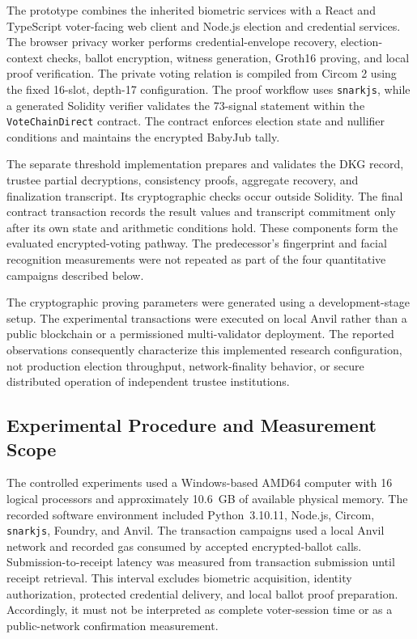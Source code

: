 The prototype combines the inherited biometric services with a
React and TypeScript voter-facing web client and Node.js election
and credential services. The browser privacy worker performs
credential-envelope recovery, election-context checks, ballot
encryption, witness generation, Groth16 proving, and local proof
verification. The private voting relation is compiled from Circom 2
using the fixed 16-slot, depth-17 configuration. The proof workflow
uses \texttt{snarkjs}, while a generated Solidity verifier validates
the 73-signal statement within the
\texttt{VoteChainDirect} contract. The contract enforces election
state and nullifier conditions and maintains the encrypted
BabyJub tally.

The separate threshold implementation prepares and validates the DKG
record, trustee partial decryptions, consistency proofs, aggregate
recovery, and finalization transcript. Its cryptographic checks occur
outside Solidity. The final contract transaction records the result
values and transcript commitment only after its own state and arithmetic
conditions hold. These components form the evaluated encrypted-voting
pathway. The predecessor's fingerprint and facial recognition
measurements were not repeated as part of the four quantitative
campaigns described below.

The cryptographic proving parameters were generated using a
development-stage setup. The experimental transactions were executed
on local Anvil rather than a public blockchain or a permissioned
multi-validator deployment. The reported observations consequently
characterize this implemented research configuration, not production
election throughput, network-finality behavior, or secure distributed
operation of independent trustee institutions.

\subsection{Experimental Procedure and Measurement Scope}
\label{subsec:experimental-environment}
\label{subsec:experimental-campaigns}

The controlled experiments used a Windows-based AMD64 computer
with 16 logical processors and approximately 10.6~GB of available
physical memory. The recorded software environment included
Python~3.10.11, Node.js, Circom, \texttt{snarkjs}, Foundry, and
Anvil. The transaction campaigns used a local Anvil network and
recorded gas consumed by accepted encrypted-ballot calls.
Submission-to-receipt latency was measured from transaction
submission until receipt retrieval. This interval excludes
biometric acquisition, identity authorization, protected credential
delivery, and local ballot proof preparation. Accordingly, it
must not be interpreted as complete voter-session time or as a
public-network confirmation measurement.

